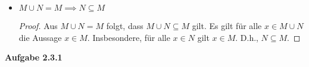 \documentclass[12pt]{extarticle}
\begin{document}
\begin{itemize}
\begin{proof}
\begin{itemize}
      Wegen \(N \subseteq M\), gilt \((M \cup N) \subseteq (M \cup M) = M\),
      also, \(M \cup N \subseteq M\).
    \end{itemize}


    Weil die beide Aussagen \(M \subseteq M \cup N\) und
    \(M \cup N \subseteq M\) wahr sind, ist auch die Aussage
    \(M \cup N = M\) wahr.
  \end{proof}

\item \(M \cup N = M \implies N \subseteq M\)

  \begin{proof}
    Aus \(M \cup N = M\) folgt, dass \(M \cup N \subseteq M\) gilt.
    Es gilt für alle \(x \in M \cup N\) die Aussage \(x \in M\).
    Insbesondere, für alle \(x \in N\) gilt \(x \in M\).  D.h., $N \subseteq
    M$.
  \end{proof}
\end{itemize}

\textbf{Aufgabe 2.3.1}
\end{document}
